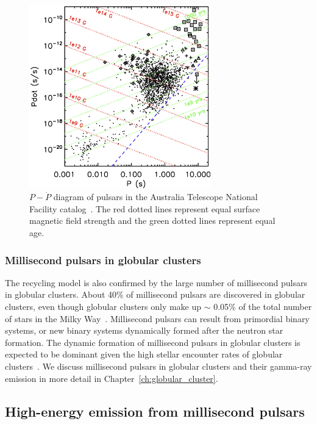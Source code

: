 \documentclass[doublespace,nopageskip]{VTthesis}
\begin{document}
\begin{figure}[htb]
    \centering
    \includegraphics[width=0.7\textwidth]{Figures/Intro/PP.png}
    \caption{$P-\dot{P}$ diagram of pulsars in the Australia Telescope National Facility catalog~\cite{2011AIPC.1357..269T,2005AJ....129.1993M}. The red dotted lines represent equal surface magnetic field strength and the green dotted lines represent equal age.}
    \label{fig:pp}
\end{figure}

\subsubsection{Millisecond pulsars in globular clusters}

The recycling model is also confirmed by the large number of millisecond pulsars in globular clusters. About 40\% of millisecond pulsars are discovered in globular clusters, even though globular clusters only make up $\sim$ 0.05\% of the total number of stars in the Milky Way~\cite{2019ApJ...877..122Y}. 
{Millisecond pulsars can result from primordial binary systems, or new binary systems dynamically formed after the neutron star formation. The dynamic formation of millisecond pulsars in globular clusters is expected to be dominant given the high stellar encounter rates of globular clusters~\cite{2013ApJ...766..136B}.}
We discuss millisecond pulsars in globular clusters and their gamma-ray emission in more detail in Chapter~\ref{ch:globular_cluster}.

\subsection{High-energy emission from millisecond pulsars}\label{sse:he_msp}
\end{document}
